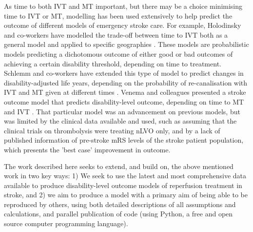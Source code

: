 \begin{multicols}{2}
As time to both IVT and MT important, but there may be a choice minimising time to IVT or MT, modelling has been used extensively to help predict the outcome of different models of emergency stroke care. For example, Holodinsky and co-workers have modelled the trade-off between time to IVT both as a general model \cite{holodinsky_drip-and-ship_2018} and applied to specific geographies \cite{kamal_geographic_2018}. These models are probabilistic models predicting a dichotomous outcome of either good or bad outcomes of achieving a certain disability threshold, depending on time to treatment. Schlemm and co-workers have extended this type of model to predict changes in disability-adjusted life years, depending on the probability of re-canalisation with IVT and MT given at different times \cite {schlemm_comparative_2019}. Venema and colleagues presented a stroke outcome model that predicts disability-level outcome, depending on time to MT and IVT \cite{venema_personalized_2019}. That particular model was an advancement on previous models, but was limited by the clinical data available and used, such as assuming that the clinical trials on thrombolysis were treating nLVO only, and by a lack of published information of pre-stroke mRS levels of the stroke patient population, which presents the 'best case' improvement in outcome.

The work described here seeks to extend, and build on, the above mentioned work in two key ways: 1) We seek to use the latest and most comprehensive data available to produce disability-level outcome models of reperfusion treatment in stroke, and 2) we aim to produce a model with a primary aim of being able to be reproduced by others, using both detailed descriptions of all assumptions and calculations, and parallel publication of code (using Python, a free and open source computer programming language).
\end{multicols}